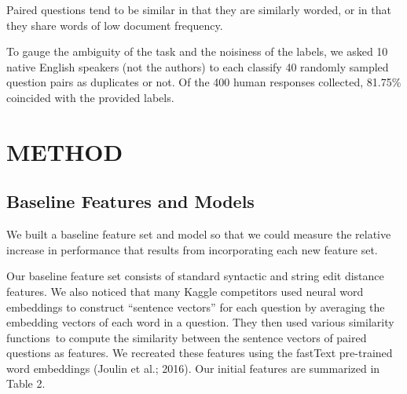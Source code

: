 \documentclass[letterpaper, 10 pt, conference]{ieeeconf}  %
\begin{document}
Paired questions tend to be similar in that they are similarly worded, or in that they share words of low document frequency.

To gauge the ambiguity of the task and the noisiness of the labels, we asked 10 native English speakers (not the authors) to each classify 40 randomly sampled question pairs as duplicates or not. Of the 400 human responses collected, 81.75\% coincided with the provided labels.


\section{METHOD}


\subsection{Baseline Features and Models} 

We built a baseline feature set and model so that we could measure the relative increase in performance that results from incorporating each new feature set.

Our baseline feature set consists of standard syntactic and string edit distance features\footnotemark . We also noticed that many Kaggle competitors used neural word embeddings to construct “sentence vectors” for each question by averaging the embedding vectors of each word in a question. They then used various similarity functions\footnotemark \ to compute the similarity between the sentence vectors of paired questions as features. We recreated these features using the fastText pre-trained word embeddings (Joulin et al.; 2016). Our initial features are summarized in Table 2.
\end{document}
